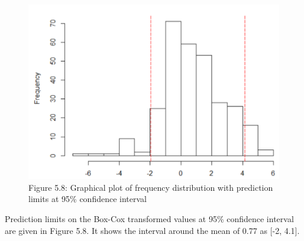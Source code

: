 \documentclass[
  10pt,
  b5paper,
]{book}
\newenvironment{Shaded}{\begin{snugshade}}{\end{snugshade}}
\newcommand{\CommentTok}[1]{\textcolor[rgb]{0.56,0.35,0.01}{\textit{#1}}}
\newcommand{\DataTypeTok}[1]{\textcolor[rgb]{0.13,0.29,0.53}{#1}}
\newcommand{\DecValTok}[1]{\textcolor[rgb]{0.00,0.00,0.81}{#1}}
\newcommand{\FloatTok}[1]{\textcolor[rgb]{0.00,0.00,0.81}{#1}}
\newcommand{\KeywordTok}[1]{\textcolor[rgb]{0.13,0.29,0.53}{\textbf{#1}}}
\newcommand{\NormalTok}[1]{#1}
\newcommand{\OperatorTok}[1]{\textcolor[rgb]{0.81,0.36,0.00}{\textbf{#1}}}
\newcommand{\StringTok}[1]{\textcolor[rgb]{0.31,0.60,0.02}{#1}}
\begin{document}
\begin{figure}
\centering
\includegraphics{figures/images/Figure5.8.PNG}
\caption{Figure 5.8: Graphical plot of frequency distribution with prediction limits at 95\% confidence interval}
\end{figure}

Prediction limits on the Box-Cox transformed values at 95\% confidence interval are given in Figure 5.8. It shows the interval around the mean of 0.77 as {[}-2, 4.1{]}.

\begin{Shaded}
\end{Shaded}
\end{document}
